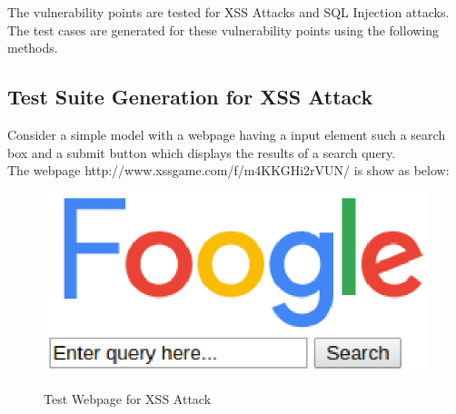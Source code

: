 The vulnerability points are tested for XSS Attacks and SQL Injection attacks. The test cases are generated for these vulnerability points using the following methods.

\subsection{Test Suite Generation for XSS Attack}

Consider a simple model with a webpage having a input element such a search box and a submit button which displays the results of a search query. \\

The webpage http://www.xssgame.com/f/m4KKGHi2rVUN/ is show as below:

\begin{figure}[!h]
 \begin{center}
    \resizebox{100mm}{75mm} {\includegraphics {Chapters/XSS.eps}}
    \caption {Test Webpage for XSS Attack}
  \label{fig:Table}
 \end{center}
\end{figure}

